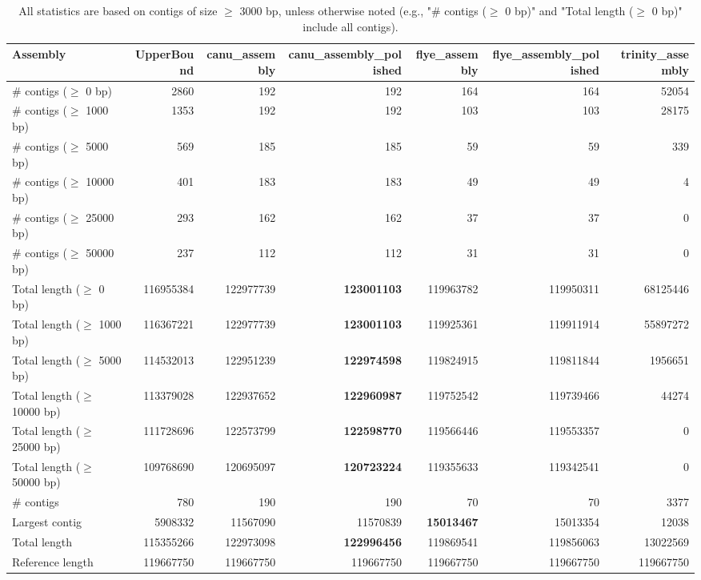 \documentclass[12pt,a4paper]{article}
\begin{document}
\begin{table}[ht]
\begin{center}
\caption{All statistics are based on contigs of size $\geq$ 3000 bp, unless otherwise noted (e.g., "\# contigs ($\geq$ 0 bp)" and "Total length ($\geq$ 0 bp)" include all contigs).}
\begin{tabular}{|l*{6}{|r}|}
\hline
Assembly & UpperBound & canu\_assembly & canu\_assembly\_polished & flye\_assembly & flye\_assembly\_polished & trinity\_assembly \\ \hline
\# contigs ($\geq$ 0 bp) & 2860 & 192 & 192 & 164 & 164 & 52054 \\ \hline
\# contigs ($\geq$ 1000 bp) & 1353 & 192 & 192 & 103 & 103 & 28175 \\ \hline
\# contigs ($\geq$ 5000 bp) & 569 & 185 & 185 & 59 & 59 & 339 \\ \hline
\# contigs ($\geq$ 10000 bp) & 401 & 183 & 183 & 49 & 49 & 4 \\ \hline
\# contigs ($\geq$ 25000 bp) & 293 & 162 & 162 & 37 & 37 & 0 \\ \hline
\# contigs ($\geq$ 50000 bp) & 237 & 112 & 112 & 31 & 31 & 0 \\ \hline
Total length ($\geq$ 0 bp) & 116955384 & 122977739 & {\bf 123001103} & 119963782 & 119950311 & 68125446 \\ \hline
Total length ($\geq$ 1000 bp) & 116367221 & 122977739 & {\bf 123001103} & 119925361 & 119911914 & 55897272 \\ \hline
Total length ($\geq$ 5000 bp) & 114532013 & 122951239 & {\bf 122974598} & 119824915 & 119811844 & 1956651 \\ \hline
Total length ($\geq$ 10000 bp) & 113379028 & 122937652 & {\bf 122960987} & 119752542 & 119739466 & 44274 \\ \hline
Total length ($\geq$ 25000 bp) & 111728696 & 122573799 & {\bf 122598770} & 119566446 & 119553357 & 0 \\ \hline
Total length ($\geq$ 50000 bp) & 109768690 & 120695097 & {\bf 120723224} & 119355633 & 119342541 & 0 \\ \hline
\# contigs & 780 & 190 & 190 & 70 & 70 & 3377 \\ \hline
Largest contig & 5908332 & 11567090 & 11570839 & {\bf 15013467} & 15013354 & 12038 \\ \hline
Total length & 115355266 & 122973098 & {\bf 122996456} & 119869541 & 119856063 & 13022569 \\ \hline
Reference length & 119667750 & 119667750 & 119667750 & 119667750 & 119667750 & 119667750 \\ \hline

\end{tabular}
\end{center}
\end{table}
\end{document}
